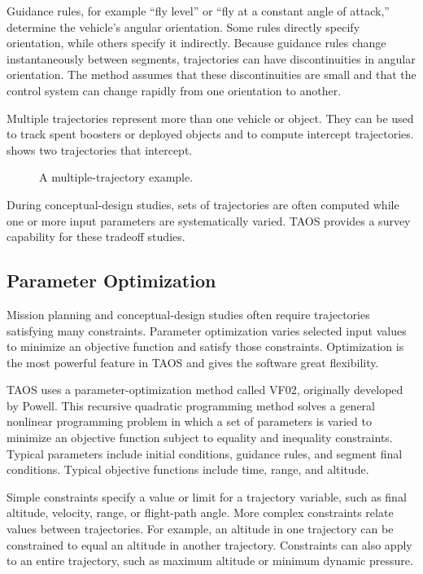Guidance rules, for example ``fly level'' or ``fly at a constant angle of attack,''
determine the vehicle's angular orientation. Some rules directly specify orientation,
while others specify it indirectly. Because guidance rules change instantaneously
between segments, trajectories can have discontinuities in angular orientation. The
method assumes that these discontinuities are small and that the control system can
change rapidly from one orientation to another.

Multiple trajectories represent more than one vehicle or object. They can be used to
track spent boosters or deployed objects and to compute intercept trajectories.
 shows two trajectories that intercept.

\begin{figure}[htbp]
  \centering
  \resizebox{0.60\linewidth}{!}{}
  \caption{A multiple-trajectory example.}
  \label{fig:multiple-trajectory-example}
\end{figure}

During conceptual-design studies, sets of trajectories are often computed while one
or more input parameters are systematically varied. TAOS provides a survey
capability for these tradeoff studies.

\subsection*{Parameter Optimization}

Mission planning and conceptual-design studies often require trajectories satisfying
many constraints. Parameter optimization varies selected input values to minimize an
objective function and satisfy those constraints. Optimization is the most powerful
feature in TAOS and gives the software great flexibility.

TAOS uses a parameter-optimization method called VF02, originally developed by
Powell. This recursive quadratic programming method solves a general nonlinear
programming problem in which a set of parameters is varied to minimize an objective
function subject to equality and inequality constraints. Typical parameters include
initial conditions, guidance rules, and segment final conditions. Typical objective
functions include time, range, and altitude.

Simple constraints specify a value or limit for a trajectory variable, such as final
altitude, velocity, range, or flight-path angle. More complex constraints relate values
between trajectories. For example, an altitude in one trajectory can be constrained
to equal an altitude in another trajectory. Constraints can also apply to an entire
trajectory, such as maximum altitude or minimum dynamic pressure.

